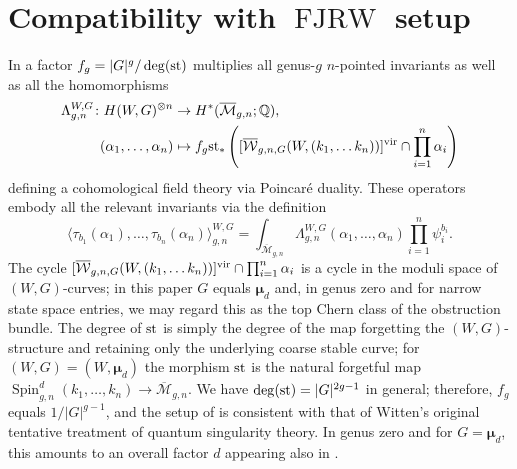 \documentclass[11pt]{amsart}
\theoremstyle{definition} %
\theoremstyle{remark} %
\newcommand{\QQ}{\mathbb Q}
\newcommand{\al}{\alpha}
\providecommand{\abs}[1]{\lvert#1\rvert}
\def\vir{{\rm vir}}
\def\ol{\overline}
\newcommand{\bmu}{\boldsymbol{\mu}}
\newcommand{\FJRW}{{\operatorname{FJRW}}}
\newcommand{\Spin}{\operatorname{Spin}}
\begin{document}
\section{Compatibility with $\FJRW$ setup}
\label{sec:factorofd}
In \cite{FJR1} a factor $f_g=\abs{G}^g/\deg({\rm st})$ multiplies 
all genus-$g$ $n$-pointed invariants as well as all 
the homomorphisms 
\begin{align*}\label{eq:CohFT}
\Lambda_{g,n}^{W,G} \colon H(W,G)^{\otimes n} 
&\to H^*(\ol {\mathcal M}_{g,n};\QQ),\\ 
(\al_1,\dots,\al_n) &\mapsto  f_g {\rm st}_*
\left([\ol{\mathcal W}_{g,n,G}(W, (k_1,\dots k_n))]^{\vir}\cap 
\prod_{i=1}^n \al_i \right)
\end{align*}
defining a cohomological field theory via Poincar\'e duality. 
These operators embody 
all the relevant invariants via the definition 
\[
\langle \tau_{b_1}(\al_1),\dots,\tau_{b_n}(\al_n)\rangle^{W,G}_{g,n}
=\int_{\ol {\mathcal M}_{g,n}} \Lambda_{g,n}^{W,G}(\al_1,\dots,\al_n) 
\prod_{i=1}^n \psi_i^{b_i}.
\]
The cycle $[\ol{\mathcal W}_{g,n,G} 
(W,(k_1,\dots k_n))]^{\vir}\cap 
\prod_{i=1}^n \al_i$ 
is a cycle in the moduli space of $(W,G)$-curves; 
in this paper $G$ equals $\bmu_d$ and, in genus zero and
for narrow state space entries, 
we may regard this  as 
the top Chern class of the obstruction bundle.
The degree of $\rm st$ is simply the degree 
of the map forgetting the $(W,G)$-structure and retaining 
only the underlying coarse stable curve; 
for $(W,G)=(W,\bmu_d)$ the morphism $\rm st$ 
is the natural forgetful map 
$\Spin^d_{g,n}(k_1,\dots,k_n)\to \ol{\mathcal M}_{g,n}$.
We have $\deg({\rm st})=\abs{G}^{2g-1}$ in general; 
therefore, $f_g$ equals $1/\abs{G}^{g-1}$,
and the setup of \cite{FJR1} is consistent 
with that of Witten's original tentative 
treatment \cite{Witten:original} of quantum singularity theory. 
In genus zero and for $G=\bmu_d$, 
this amounts to an overall factor $d$ 
appearing also in \cite[(14)]{ChiR}. 
\end{document}
